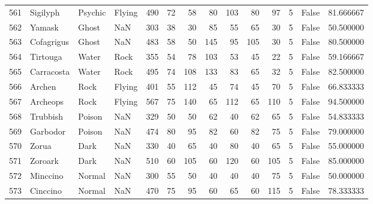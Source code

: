 \begin{tabular}{rlllrrrrrrrrlr}
 561 &                   Sigilyph &   Psychic &    Flying &    490 &   72 &      58 &       80 &      103 &       80 &     97 &           5 &      False &   81.666667 \\
 562 &                     Yamask &     Ghost &       NaN &    303 &   38 &      30 &       85 &       55 &       65 &     30 &           5 &      False &   50.500000 \\
 563 &                 Cofagrigus &     Ghost &       NaN &    483 &   58 &      50 &      145 &       95 &      105 &     30 &           5 &      False &   80.500000 \\
 564 &                   Tirtouga &     Water &      Rock &    355 &   54 &      78 &      103 &       53 &       45 &     22 &           5 &      False &   59.166667 \\
 565 &                 Carracosta &     Water &      Rock &    495 &   74 &     108 &      133 &       83 &       65 &     32 &           5 &      False &   82.500000 \\
 566 &                     Archen &      Rock &    Flying &    401 &   55 &     112 &       45 &       74 &       45 &     70 &           5 &      False &   66.833333 \\
 567 &                   Archeops &      Rock &    Flying &    567 &   75 &     140 &       65 &      112 &       65 &    110 &           5 &      False &   94.500000 \\
 568 &                   Trubbish &    Poison &       NaN &    329 &   50 &      50 &       62 &       40 &       62 &     65 &           5 &      False &   54.833333 \\
 569 &                   Garbodor &    Poison &       NaN &    474 &   80 &      95 &       82 &       60 &       82 &     75 &           5 &      False &   79.000000 \\
 570 &                      Zorua &      Dark &       NaN &    330 &   40 &      65 &       40 &       80 &       40 &     65 &           5 &      False &   55.000000 \\
 571 &                    Zoroark &      Dark &       NaN &    510 &   60 &     105 &       60 &      120 &       60 &    105 &           5 &      False &   85.000000 \\
 572 &                   Minccino &    Normal &       NaN &    300 &   55 &      50 &       40 &       40 &       40 &     75 &           5 &      False &   50.000000 \\
 573 &                   Cinccino &    Normal &       NaN &    470 &   75 &      95 &       60 &       65 &       60 &    115 &           5 &      False &   78.333333 \\

\end{tabular}
